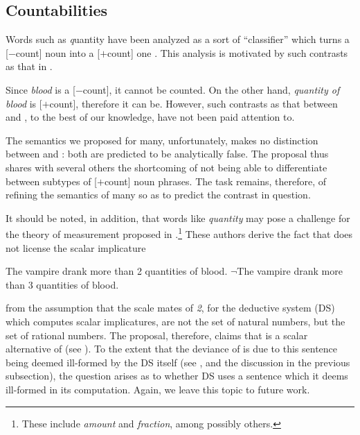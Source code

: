 \documentclass[output=paper]{langscibook}
\begin{document}
\subsection{Countabilities} \label{hai-tri:sec:countabilities}

Words such as {\textit quantity} have been analyzed as a sort of ``classifier'' which turns a [$-$count] noun into a [$+$count] one \citep[cf.][]{Chierchia:2010}. This analysis is motivated by such contrasts as that in . 

\ea \label{hai-tri:vampire}
\label{hai-tri:bloods}
\label{hai-tri:quantitiesofblood}
\z
\z

\noindent Since \textit{blood} is a [$-$count], it cannot be counted. On the other hand, \textit{quantity of blood} is [$+$count], therefore it can be. However, such contrasts as that between  and , to the best of our knowledge, have not been paid attention to.\largerpage

\label{hai-tri:2.3}
\z

\noindent The semantics we proposed for {\sc many}, unfortunately, makes no distinction between  and : both are predicted to be analytically false. The proposal thus shares with several others the shortcoming of not being able to differentiate between subtypes of [$+$count] noun phrases. The task remains, therefore, of refining the semantics of {\sc many} so as to predict the contrast in question.

It should be noted, in addition, that words like \textit{quantity} may pose a challenge for the theory of measurement proposed in \citet{foxhackl2006universal}.\footnote{These include \textit{amount} and \textit{fraction}, among possibly others.

\ea
{}
\z
\z
} These authors derive the fact that  does not license the scalar implicature  

\ea
\ea The vampire drank more than 2 quantities of blood.
\label{hai-tri:morethan2}
\ex $\neg$The vampire drank more than 3 quantities of blood.
\label{hai-tri:morethan3}
\z
\z

\noindent from the assumption that the scale mates of \textit{2}, for the deductive system (DS) which computes scalar implicatures, are not the set of natural numbers, but the set of rational numbers. The proposal, therefore, claims that  is a scalar alternative of  (see ). To the extent that the deviance of  is due to this sentence being deemed ill-formed by the DS itself (see \citealt{gajewski2003analyticity, foxhackl2006universal}, and the discussion in the previous subsection), the question arises as to whether DS uses a sentence which it deems ill-formed in its computation. Again, we leave this topic to future work.  
\end{document}
